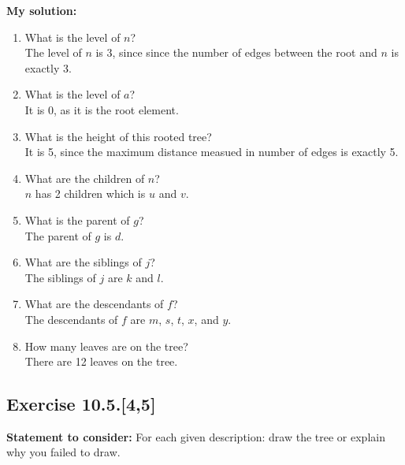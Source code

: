 \documentclass{report}
\newcommand{\assignmentDescription}{\textbf{Statement to consider: }}
\newcommand{\solution}{\textbf{My solution: }}
\newcommand{\Exercise}[1]{\subsection{Exercise #1}}
\newcommand{\defaultEnumerateLabel}{\textbf{\alph*.}}
\newcommand{\myItem}[1]{\item #1\\}
\begin{document}
	\solution
	\begin{enumerate}[label=\defaultEnumerateLabel]
		\myItem{What is the level of $n$?}
		
		The level of $n$ is 3, since since the number of edges between the root and $n$ is exactly 3.
		\myItem{What is the level of $a$?}
		
		It is 0, as it is the root element.
		
		\myItem{What is the height of this rooted tree?}
		
		It is 5, since the maximum distance measued in number of edges is exactly 5.
		\myItem{What are the children of $n$?}
		
		$n$ has 2 children which is $u$ and $v$.
		
		\myItem{What is the parent of $g$?}
		
		The parent of $g$ is $d$.
		
		\myItem{What are the siblings of $j$?}
		
		The siblings of $j$ are $k$ and $l$.
		
		\myItem{What are the descendants of $f$?}
		
		The descendants of $f$ are $m$, $s$, $t$, $x$, and $y$.
		\myItem{How many leaves are on the tree?}
		
		There are 12 leaves on the tree.
	\end{enumerate}
	
	\Exercise{10.5.[4,5]}
	\assignmentDescription
	For each given description: draw the tree or explain why you failed to draw.\\
	
\end{document}
